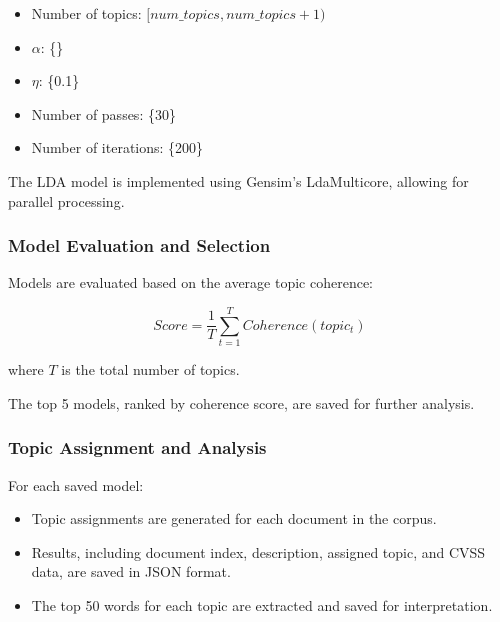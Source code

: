 \documentclass[12pt]{article}
\begin{document}
\begin{itemize}

	\item Number of topics: $[num\_topics, num\_topics + 1)$

	\item $\alpha$: \{\}

	\item $\eta$: \{0.1\}

	\item Number of passes: \{30\}

	\item Number of iterations: \{200\}

\end{itemize}

The LDA model is implemented using Gensim's LdaMulticore, allowing for parallel processing.

\subsubsection{Model Evaluation and Selection}

Models are evaluated based on the average topic coherence:

\begin{equation}
	Score = \frac{1}{T}\sum_{t=1}^{T} Coherence(topic_t)
\end{equation}

where $T$ is the total number of topics.

The top 5 models, ranked by coherence score, are saved for further analysis.

\subsubsection{Topic Assignment and Analysis}

For each saved model:

\begin{itemize}

	\item Topic assignments are generated for each document in the corpus.

	\item Results, including document index, description, assigned topic, and CVSS data, are saved
	      in JSON format.

	\item The top 50 words for each topic are extracted and saved for interpretation.

\end{itemize}
\end{document}
